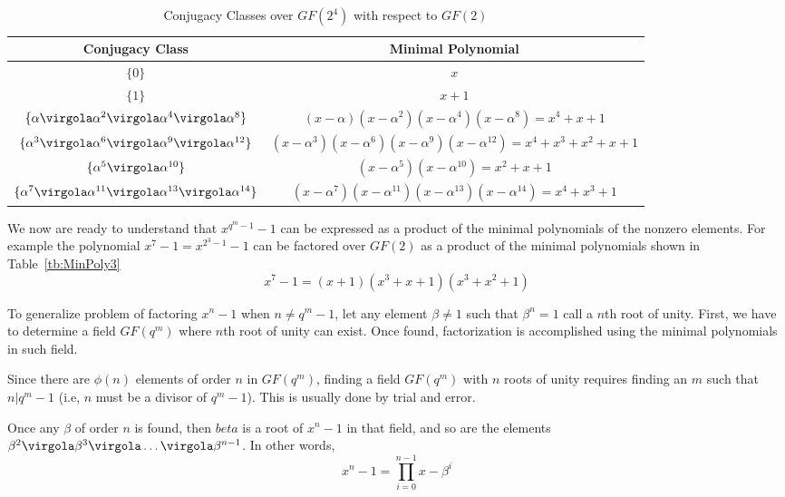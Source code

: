 \begin{table}\centering
\begin{tabular}{c| c}
Conjugacy Class & Minimal Polynomial\\
\hline
\(\{ 0\}\) & \(x\) \\
\(\{ 1\}\) & \(x+1\) \\
\(\{ \alpha \virgola \alpha^2 \virgola \alpha^4 \virgola \alpha^8\}\) &
\( (x-\alpha)(x-\alpha^2)(x-\alpha^4)(x-\alpha^8)= x^4+x+1 \) \\
\(\{ \alpha^3 \virgola \alpha^6 \virgola \alpha^9 \virgola \alpha^{12} \}\) &
\( (x-\alpha^3)(x-\alpha^6)(x-\alpha^9)(x-\alpha^{12})= x^4+x^3+x^2+x+1 \) \\
\(\{ \alpha^5 \virgola \alpha^{10}\}\) &
\( (x-\alpha^5)(x-\alpha^{10})= x^2+x+1 \) \\
\(\{ \alpha^7 \virgola \alpha^{11} \virgola \alpha^{13} \virgola \alpha^{14}\}\) &
\( (x-\alpha^7)(x-\alpha^{11})(x-\alpha^{13})(x-\alpha^{14})= x^4+x^3+1 \)
\end{tabular}
\caption{ Conjugacy Classes over \(GF(2^4)\) with respect to \(GF(2)\) \label{tb:MinPoly4}}
\end{table}

We now are ready to understand that \(x^{q^m-1}-1\) can be expressed as a product of the minimal polynomials of the nonzero elements. For example the polynomial
\(x^7-1 = x^{2^3-1}-1\)
can be factored over \(GF(2)\) as a product of the minimal polynomials shown in Table~\ref{tb:MinPoly3}
\begin{equation}
x^7-1=(x+1)(x^3+x+1)(x^3+x^2+1)
\end{equation}

To generalize problem of factoring \(x^n-1\) when \(n \ne q^m-1\), let any element \(\beta \ne 1\) such that \(\beta^n = 1\) call a \(n\)th root of unity. First, we have to determine a field \(GF(q^m)\) where \(n\)th root of unity can exist. Once found, factorization is accomplished using the minimal polynomials in such field.

Since there are \( \phi(n)\) elements of order \(n\) in \(GF(q^m)\), finding a field \(GF(q^m)\) with \(n\) roots of unity requires finding an \(m\) such that \(n|q^m-1\) (i.e, \(n\) must be a divisor of \(q^m-1\)). This is usually done by trial and error.

Once any \(\beta\) of order \(n\) is found, then \(beta\) is a root of \(x^n-1\) in that field, and so are the elements \(\beta^2 \virgola \beta^3 \virgola \ldots \virgola \beta^{n-1} \). In other words,
\begin{equation}
x^n-1= \prod_{i=0}^{n-1}{x-\beta^i}
\end{equation}

